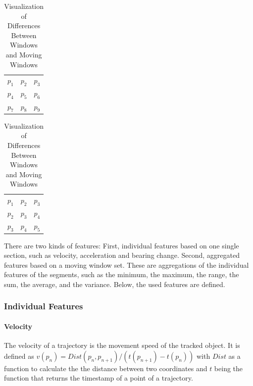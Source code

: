 \begin{table}[!htb]

    \begin{minipage}{.5\linewidth}
        \centering
        \begin{tabular}{|c c c|} 
        \toprule
        \rowcolor{white} $p_1$ & $p_2$ & $p_3$  \\
        $p_4$ & $p_5$ & $p_6$  \\
        \rowcolor{white} $p_7$ & $p_8$ & $p_9$  \\
        \bottomrule
        \end{tabular}
        \caption*{\small Windows of a Trajectory}
    \end{minipage}%
    \begin{minipage}{.5\linewidth}
      \centering
        \begin{tabular}{|c c c|} 
        \toprule
        \rowcolor{white} $p_1$ & $p_2$ & $p_3$  \\
        $p_2$ & $p_3$ & $p_4$  \\
        \rowcolor{white} $p_3$ & $p_4$ & $p_5$  \\
        \bottomrule
        \end{tabular}
    \caption*{\small Moving Windows of a Trajectory}
    \end{minipage} 
    
    \caption{Visualization of Differences Between Windows and Moving Windows}
    \label{table:comp_windows}
\end{table}

There are two kinds of features: First, individual features based on one single section, such as velocity, acceleration and bearing change. Second, aggregated features based on a moving window set. These are aggregations of the individual features of the segments, such as the minimum, the maximum, the range, the sum, the average, and the variance. Below, the used features are defined.

\subsubsection{Individual Features}

\paragraph{Velocity} The velocity of a trajectory is the movement speed of the tracked object. It is defined as $v(p_n) = Dist(p_n, p_{n+1})/(t(p_{n+1}) - t(p_n))$ with $Dist$ as a function to calculate the the distance between two coordinates and $t$ being the function that returns the timestamp of a point of a trajectory. \cite{Zheng2008}

